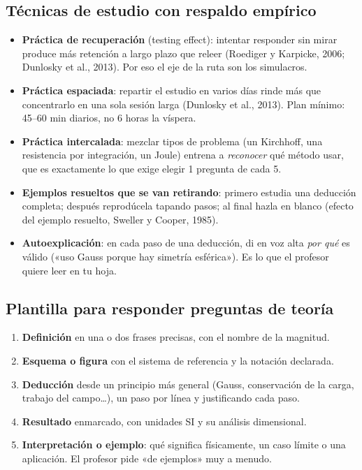 \documentclass[11pt]{article}
\begin{document}
\subsection{Técnicas de estudio con respaldo empírico}
\begin{itemize}
\item \textbf{Práctica de recuperación} (testing effect): intentar responder sin mirar produce más retención a largo plazo que releer (Roediger y Karpicke, 2006; Dunlosky et al., 2013). Por eso el eje de la ruta son los simulacros.
\item \textbf{Práctica espaciada}: repartir el estudio en varios días rinde más que concentrarlo en una sola sesión larga (Dunlosky et al., 2013). Plan mínimo: 45--60 min diarios, no 6 horas la víspera.
\item \textbf{Práctica intercalada}: mezclar tipos de problema (un Kirchhoff, una resistencia por integración, un Joule) entrena a \emph{reconocer} qué método usar, que es exactamente lo que exige elegir 1 pregunta de cada 5.
\item \textbf{Ejemplos resueltos que se van retirando}: primero estudia una deducción completa; después reprodúcela tapando pasos; al final hazla en blanco (efecto del ejemplo resuelto, Sweller y Cooper, 1985).
\item \textbf{Autoexplicación}: en cada paso de una deducción, di en voz alta \emph{por qué} es válido («uso Gauss porque hay simetría esférica»). Es lo que el profesor quiere leer en tu hoja.
\end{itemize}

\subsection{Plantilla para responder preguntas de teoría}
\begin{profe}
\begin{enumerate}[leftmargin=*]
\item \textbf{Definición} en una o dos frases precisas, con el nombre de la magnitud.
\item \textbf{Esquema o figura} con el sistema de referencia y la notación declarada.
\item \textbf{Deducción} desde un principio más general (Gauss, conservación de la carga, trabajo del campo\dots), un paso por línea y justificando cada paso.
\item \textbf{Resultado} enmarcado, con unidades SI y su análisis dimensional.
\item \textbf{Interpretación o ejemplo}: qué significa físicamente, un caso límite o una aplicación. El profesor pide «de ejemplos» muy a menudo.
\end{enumerate}
\end{profe}
\end{document}
